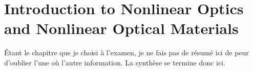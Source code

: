 \chapter{Introduction to Nonlinear Optics and Nonlinear Optical Materials}
Étant le chapitre que je choisi à l'examen, je ne fais pas de résumé ici de peur d'oublier l'une où l'autre information. La
synthèse se termine donc ici. 